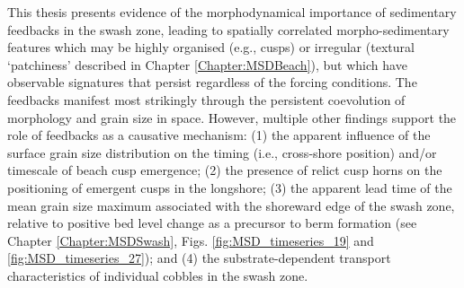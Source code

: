 
This thesis presents evidence of the morphodynamical importance of sedimentary feedbacks in the swash zone, leading to spatially correlated morpho-sedimentary features which may be highly organised (e.g., cusps) or irregular (textural `patchiness' described in Chapter \ref{Chapter:MSDBeach}), but which have observable signatures that persist regardless of the forcing conditions. The feedbacks manifest most strikingly through the persistent coevolution of morphology and grain size in space. However, multiple other findings support the role of feedbacks as a causative mechanism: (1) the apparent influence of the surface grain size distribution on the timing (i.e., cross-shore position) and/or timescale of beach cusp emergence; (2) the presence of relict cusp horns on the positioning of emergent cusps in the longshore; (3) the apparent lead time of the mean grain size maximum associated with the shoreward edge of the swash zone, relative to positive bed level change as a precursor to berm formation (see Chapter \ref{Chapter:MSDSwash}, Figs. \ref{fig:MSD_timeseries_19} and \ref{fig:MSD_timeseries_27}); and (4) the substrate-dependent transport characteristics of individual cobbles in the swash zone. %


